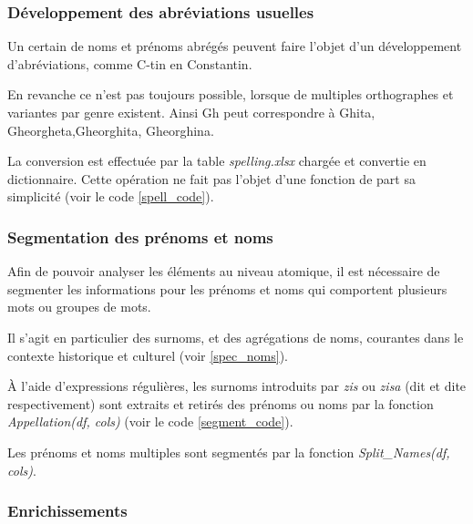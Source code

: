 \documentclass[a4paper,12pt,twoside]{book}
\begin{document}
	            \subsubsection{Développement des abréviations usuelles}
	            
	            
	               Un certain de noms et prénoms abrégés peuvent faire l'objet d'un développement d'abréviations, comme \og{}C-tin\fg{} en \og{}Constantin\fg{}.
	               
	               En revanche ce n'est pas toujours possible, lorsque de multiples orthographes et variantes par genre existent. Ainsi \og{}Gh\fg{} peut correspondre à \og{}Ghita\fg{}, \og{}Gheorgheta\fg{},\og{}Gheorghita\fg{}, \og{}Gheorghina\fg{}.
	               
	               \label{spell}La conversion est effectuée par la table \textit{spelling.xlsx} chargée et convertie en dictionnaire.
	               Cette opération ne fait pas l'objet d'une fonction de part sa simplicité (voir le code \ref{spell_code}).
	               
	           \subsubsection{Segmentation des prénoms et noms}
	            \label{segment}
	            
	               Afin de pouvoir analyser les éléments au niveau atomique, il est nécessaire de segmenter les informations pour les prénoms et noms qui comportent plusieurs mots ou groupes de mots.
	               
	               Il s'agit en particulier des surnoms, et des agrégations de noms, courantes dans le contexte historique et culturel (voir \ref{spec_noms}).
	               
	               À l'aide d'expressions régulières, les surnoms introduits par \textit{zis} ou \textit{zisa} (\og{}dit\fg{} et \og{}dite\fg{} respectivement) sont extraits et retirés des prénoms ou noms par la fonction \textit{Appellation(df, cols)} (voir le code \ref{segment_code}).
	               
	               Les prénoms et noms multiples sont segmentés par la fonction \textit{Split\_Names(df, cols)}.
	              
	            \subsubsection{Enrichissements}
	            \label{enrich}
	            
\end{document}
